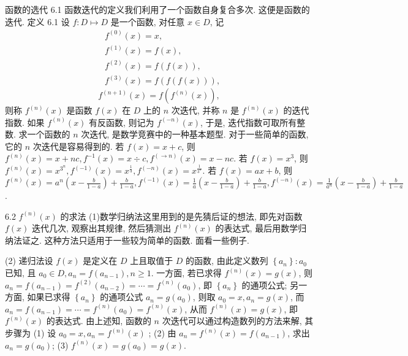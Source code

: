 
函数的选代
6.1 函数迭代的定义我们利用了一个函数自身复合多次.
这便是函数的迭代.
定义 6.1 设 $f: D \mapsto D$ 是一个函数, 对任意 $x \in D$, 记
$$
\begin{aligned}
& f^{(0)}(x)=x, \\
& f^{(1)}(x)=f(x), \\
& f^{(2)}(x)=f(f(x)), \\
& f^{(3)}(x)=f(f(f(x))),
\end{aligned}
$$
$$
f^{(n+1)}(x)=f\left(f^{(n)}(x)\right),
$$
则称 $f^{(n)}(x)$ 是函数 $f(x)$ 在 $D$ 上的 $n$ 次迭代, 并称 $n$ 是 $f^{(n)}(x)$ 的迭代指数.
如果 $f^{(n)}(x)$ 有反函数, 则记为 $f^{(-n)}(x)$, 于是, 迭代指数可取所有整数.
求一个函数的 $n$ 次迭代, 是数学竞赛中的一种基本题型.
对于一些简单的函数, 它的 $n$ 次迭代是容易得到的.
若 $f(x)=x+c$, 则 $f^{(n)}(x)=x+n c, f^{-1}(x)=x \div c, f^{(\rightarrow n)}(x)=x-n c$.
若 $f(x)=x^3$, 则 $f^{(n)}(x)=x^{3^n}, f^{(-1)}(x)=x^{\frac{1}{3}}, f^{(-n)}(x)=x^{\frac{1}{3^n}}$.
若 $f(x)=a x+b$, 则 $f^{(n)}(x)=a^n\left(x-\frac{b}{1-a}\right)+\frac{b}{1-a}, f^{(-1)}(x)= \frac{1}{a}\left(x-\frac{b}{1-a}\right)+\frac{b}{1-a}, f^{(-n)}(x)=\frac{1}{a^n}\left(x-\frac{b}{1-a}\right)+\frac{b}{1-a}$.



6.2 $f^{(n)}(x)$ 的求法
(1)数学归纳法这里用到的是先猜后证的想法, 即先对函数 $f(x)$ 迭代几次, 观察出其规律, 然后猜测出 $f^{(n)}(x)$ 的表达式, 最后用数学归纳法证之.
这种方法只适用于一些较为简单的函数.
面看一些例子.



(2) 递归法设 $f(x)$ 是定义在 $D$ 上且取值于 $D$ 的函数, 由此定义数列 $\left\{a_n\right\}: a_0$ 已知, 且 $a_0 \in D, a_n=f\left(a_{n-1}\right), n \geqslant 1$. 一方面, 若已求得 $f^{(n)}(x)=g(x)$, 则 $a_n= f\left(a_{n-1}\right)=f^{(2)}\left(a_{n-2}\right)=\cdots=f^{(n)}\left(a_0\right)$, 即 $\left\{a_n\right\}$ 的通项公式; 另一方面, 如果已求得 $\left\{a_n\right\}$ 的通项公式 $a_n=g\left(a_0\right)$, 则取 $a_0=x, a_n=g(x)$, 而 $a_n=f\left(a_{n-1}\right)=\cdots= f^{(n)}\left(a_0\right)=f^{(n)}(x)$, 从而 $f^{(n)}(x)=g(x)$, 即 $f^{(n)}(x)$ 的表达式.
由上述知, 函数的 $n$ 次迭代可以通过构造数列的方法来解, 其步骤为
(1) 设 $a_0=x, a_n=f^{(n)}(x)$ ;
(2) 由 $a_n=f^{(n)}(x)=f\left(a_{n-1}\right)$, 求出 $a_n=g\left(a_0\right)$;
(3) $f^{(n)}(x)=g\left(a_0\right)=g(x)$.



